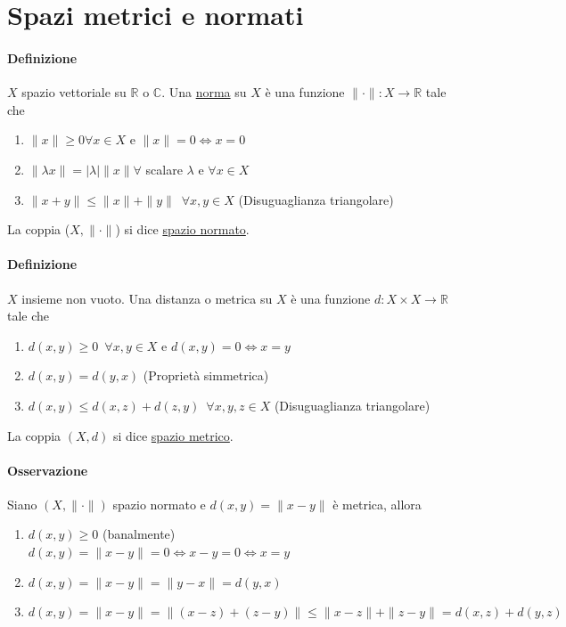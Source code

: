 \documentclass{article}
\newcommand{\R}{\mathbb{R}}
\newcommand{\C}{\mathbb{C}}
\begin{document}
\section{\Large\textbf{Spazi metrici e normati}}
\paragraph{{Definizione}}
$X$ spazio vettoriale su $\R$ o $\C$. Una \underline{norma} su $X$ è una funzione $\|\cdot\| : X\rightarrow \R$ tale che 
\begin{enumerate}
    \item $\| x\|\geq 0 \forall x \in X$ e $\| x\|=0 \Leftrightarrow x=0$
    \item $\| \lambda x\|=|\lambda|\| x\| \forall$ scalare $\lambda$ e $\forall x \in X$
    \item $\| x+y \| \leq \| x\| + \| y \| \,\,\, \forall x,y \in X$ (Disuguaglianza triangolare)
\end{enumerate}
La coppia ($X,\|\cdot\|$) si dice \underline{spazio normato}.

\paragraph{{Definizione}}
$X$ insieme non vuoto. Una distanza o metrica su $X$ è una funzione $d:X \times X\rightarrow \R$ tale che
\begin{enumerate}
    \item $d(x,y)\geq 0 \,\,\, \forall x,y \in X $ e $d(x,y)=0 \Leftrightarrow x=y$
    \item $d(x,y)=d(y,x)$ (Proprietà simmetrica)
    \item $d(x,y)\leq d(x,z)+d(z,y) \,\,\, \forall x,y,z \in X$ (Disuguaglianza triangolare)
\end{enumerate}
La coppia $(X,d)$ si dice \underline{spazio metrico}.

\paragraph{Osservazione}
Siano $(X,\|\cdot\|)$ spazio normato e $d(x,y)=\| x-y\|$ è metrica, allora
\begin{enumerate}
    \item $d(x,y)\geq 0$ (banalmente)\\
          $d(x,y)=\| x-y\| =0 \Leftrightarrow x-y=0 \Leftrightarrow x=y$
    \item$d(x,y)= \| x-y\|=\| y-x\| =d(y,x)$
    \item $d(x,y)=\| x-y\|=\|(x-z)+(z-y)\|\leq \|x-z\|+\| z-y\|=d(x,z)+d(y,z)$
\end{enumerate}
\end{document}
